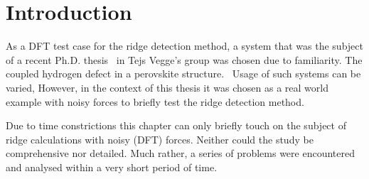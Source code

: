 \section{Introduction}
\label{sec:perovskites-introduction}

As a DFT test case for the ridge detection method, a system that was the subject of a recent Ph.D. thesis~\cite{nicolai-2010} in Tejs Vegge's group was chosen due to familiarity.
The coupled hydrogen defect in a  perovskite structure.~\cite{double-defect-2011}
Usage of such systems can be varied, \expand
However, in the context of this thesis it was chosen as a real world example with noisy forces to briefly test the ridge detection method.


Due to time constrictions this chapter can only briefly touch on the subject of ridge calculations with noisy (DFT) forces.
Neither could the study be comprehensive nor detailed.
Much rather, a series of problems were encountered and analysed within a very short period of time.

